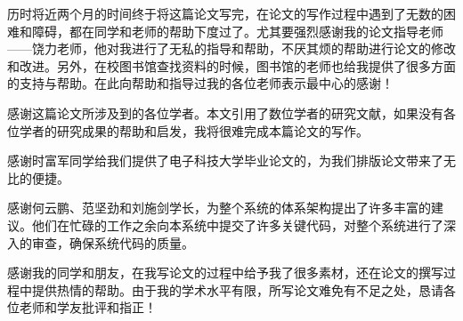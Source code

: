 
历时将近两个月的时间终于将这篇论文写完，在论文的写作过程中遇到了无数的困难和障碍，都在同学和老师的帮助下度过了。尤其要强烈感谢我的论文指导老师——饶力老师，他对我进行了无私的指导和帮助，不厌其烦的帮助进行论文的修改和改进。另外，在校图书馆查找资料的时候，图书馆的老师也给我提供了很多方面的支持与帮助。在此向帮助和指导过我的各位老师表示最中心的感谢！

感谢这篇论文所涉及到的各位学者。本文引用了数位学者的研究文献，如果没有各位学者的研究成果的帮助和启发，我将很难完成本篇论文的写作。

感谢时富军同学给我们提供了电子科技大学毕业论文的，为我们排版论文带来了无比的便捷。

感谢何云鹏、范坚劲和刘施剑学长，为整个系统的体系架构提出了许多丰富的建议。他们在忙碌的工作之余向本系统中提交了许多关键代码，对整个系统进行了深入的审查，确保系统代码的质量。

感谢我的同学和朋友，在我写论文的过程中给予我了很多素材，还在论文的撰写过程中提供热情的帮助。由于我的学术水平有限，所写论文难免有不足之处，恳请各位老师和学友批评和指正！

